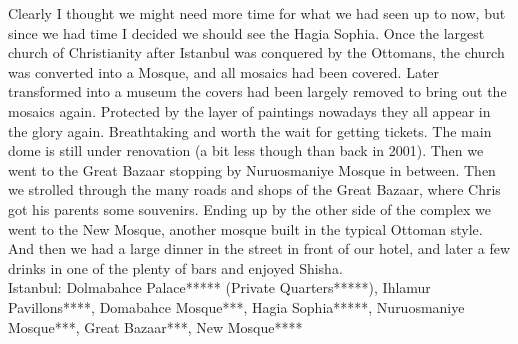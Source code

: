 Clearly I thought we might need more time for what we had seen up to now, but since we had time I decided we should see the Hagia Sophia. Once the largest church of Christianity after Istanbul was conquered by the Ottomans, the church was converted into a Mosque, and all mosaics had been covered. Later transformed into a museum the covers had been largely removed to bring out the mosaics again. Protected by the layer of paintings nowadays they all appear in the glory again. Breathtaking and worth the wait for getting tickets. The main dome is still under renovation (a bit less though than back in 2001). Then we went to the Great Bazaar stopping by Nuruosmaniye Mosque in between. Then we strolled through the many roads and shops of the Great Bazaar, where Chris got his parents some souvenirs. Ending up by the other side of the complex we went to the New Mosque, another mosque built in the typical Ottoman style. And then we had a large dinner in the street in front of our hotel, and later a few drinks in one of the plenty of bars and enjoyed Shisha.\\

Istanbul: Dolmabahce Palace***** (Private Quarters*****), Ihlamur Pavillons****, Domabahce Mosque***, Hagia Sophia*****, Nuruosmaniye Mosque***, Great Bazaar***, New Mosque****\\

